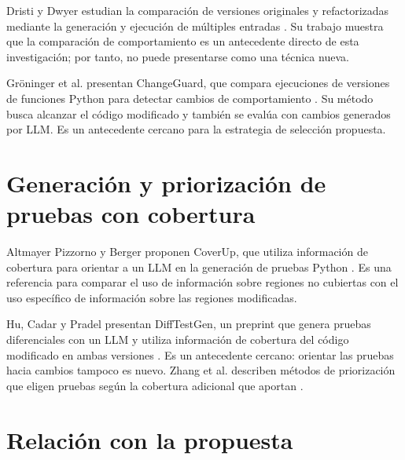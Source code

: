 \documentclass[11pt,openright,final]{unsa}
\begin{document}
Dristi y Dwyer estudian la comparación de versiones originales y refactorizadas mediante la generación y ejecución de múltiples entradas \cite{ref2}. Su trabajo muestra que la comparación de comportamiento es un antecedente directo de esta investigación; por tanto, no puede presentarse como una técnica nueva.

Gröninger et al. presentan ChangeGuard, que compara ejecuciones de versiones de funciones Python para detectar cambios de comportamiento \cite{ref4}. Su método busca alcanzar el código modificado y también se evalúa con cambios generados por LLM. Es un antecedente cercano para la estrategia de selección propuesta.

\section{Generación y priorización de pruebas con cobertura}

Altmayer Pizzorno y Berger proponen CoverUp, que utiliza información de cobertura para orientar a un LLM en la generación de pruebas Python \cite{ref5}. Es una referencia para comparar el uso de información sobre regiones no cubiertas con el uso específico de información sobre las regiones modificadas.

Hu, Cadar y Pradel presentan DiffTestGen, un preprint que genera pruebas diferenciales con un LLM y utiliza información de cobertura del código modificado en ambas versiones \cite{ref8}. Es un antecedente cercano: orientar las pruebas hacia cambios tampoco es nuevo. Zhang et al. describen métodos de priorización que eligen pruebas según la cobertura adicional que aportan \cite{ref9}.

\section{Relación con la propuesta}
\end{document}
